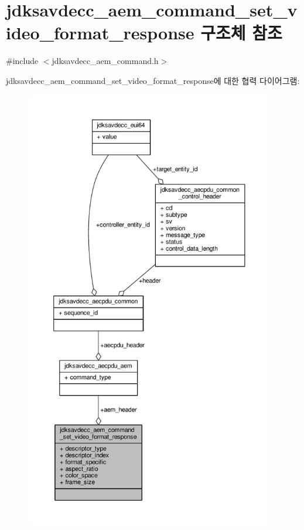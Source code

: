 \hypertarget{structjdksavdecc__aem__command__set__video__format__response}{}\section{jdksavdecc\+\_\+aem\+\_\+command\+\_\+set\+\_\+video\+\_\+format\+\_\+response 구조체 참조}
\label{structjdksavdecc__aem__command__set__video__format__response}


{\ttfamily \#include $<$jdksavdecc\+\_\+aem\+\_\+command.\+h$>$}



jdksavdecc\+\_\+aem\+\_\+command\+\_\+set\+\_\+video\+\_\+format\+\_\+response에 대한 협력 다이어그램\+:
\nopagebreak
\begin{figure}[H]
\begin{center}
\leavevmode
\includegraphics[height=550pt]{structjdksavdecc__aem__command__set__video__format__response__coll__graph}
\end{center}
\end{figure}
